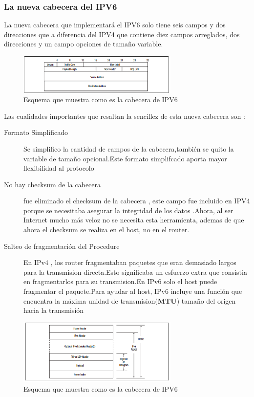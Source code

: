 \documentclass[11pt,a4paper]{article}
\begin{document}
\subsubsection{La nueva cabecera del IPV6}
La nueva cabecera que implementará el IPV6 solo tiene seis campos y dos direcciones que a diferencia del IPV4  que contiene diez campos arreglados, dos direcciones y un campo opciones de tamaño variable.
\begin{figure}[h!]
 \centering
 \includegraphics[width=0.71\textwidth]{ipv6head.png}
 \caption[Valores del campo scope]{Esquema que muestra como es la cabecera de IPV6}
\end{figure} \par
Las cualidades importantes que resaltan la sencillez de esta nueva cabecera son :
\begin{description}
\item[Formato Simplificado] Se simplifico la cantidad de campos de la cabecera,también se quito la variable de tamaño opcional.Este formato simplifcado aporta mayor flexibilidad al protocolo
\item[No hay checksum de la cabecera] fue eliminado el checksum de la cabecera , este campo fue incluido en IPV4 porque  se necesitaba asegurar la integridad de los datos .Ahora, al ser Internet mucho más veloz no se necesita esta herramienta, ademas de que ahora el checksum se realiza en el host, no en el router.
\item[Salteo de fragmentación del Procedure] En IPv4 , los router fragmentaban paquetes que eran demasiado largos para la transmision directa.Esto significaba un esfuerzo extra que consistia en fragmentarlos para su transmision.En IPv6 solo el host puede fragmentar el paquete.Para ayudar al host, IPv6 incluye una función que encuentra la máxima unidad de transmision(\textbf{MTU}) tamaño del origen hacia la transmisión

\end {description}
\begin{figure}[h!]
 \centering
 \includegraphics[width=0.71\textwidth]{header.png}
 \caption[Cabeceras IPV6]{Esquema que muestra como es la cabecera de IPV6}
\end{figure} \par
\end{document}
